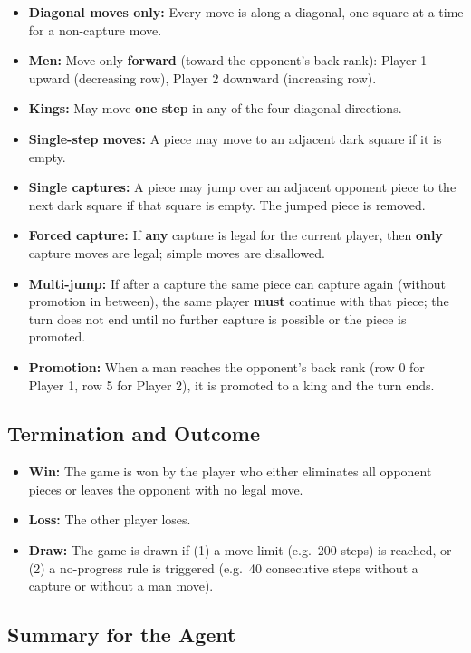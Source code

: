 \documentclass[11pt,a4paper]{article}
\begin{document}
\begin{itemize}[noitemsep]
  \item \textbf{Diagonal moves only:} Every move is along a diagonal, one square at a time for a non-capture move.
  \item \textbf{Men:} Move only \textbf{forward} (toward the opponent's back rank): Player 1 upward (decreasing row), Player 2 downward (increasing row).
  \item \textbf{Kings:} May move \textbf{one step} in any of the four diagonal directions.
  \item \textbf{Single-step moves:} A piece may move to an adjacent dark square if it is empty.
  \item \textbf{Single captures:} A piece may jump over an adjacent opponent piece to the next dark square if that square is empty. The jumped piece is removed.
  \item \textbf{Forced capture:} If \textbf{any} capture is legal for the current player, then \textbf{only} capture moves are legal; simple moves are disallowed.
  \item \textbf{Multi-jump:} If after a capture the same piece can capture again (without promotion in between), the same player \textbf{must} continue with that piece; the turn does not end until no further capture is possible or the piece is promoted.
  \item \textbf{Promotion:} When a man reaches the opponent's back rank (row 0 for Player 1, row 5 for Player 2), it is promoted to a king and the turn ends.
\end{itemize}

\subsection{Termination and Outcome}

\begin{itemize}[noitemsep]
  \item \textbf{Win:} The game is won by the player who either eliminates all opponent pieces or leaves the opponent with no legal move.
  \item \textbf{Loss:} The other player loses.
  \item \textbf{Draw:} The game is drawn if (1) a move limit (e.g.\ 200 steps) is reached, or (2) a no-progress rule is triggered (e.g.\ 40 consecutive steps without a capture or without a man move).
\end{itemize}

\subsection{Summary for the Agent}
\end{document}
